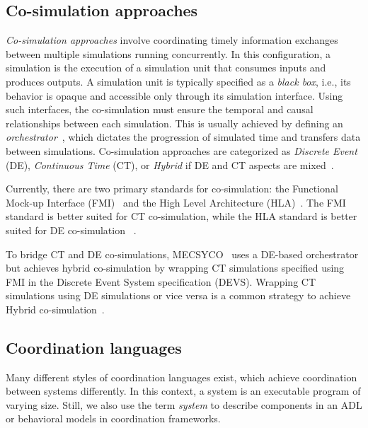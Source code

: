 \documentclass[runningheads]{llncs}
\begin{document}
\subsection{Co-simulation approaches} \label{subsec: cosim}

\textit{Co-simulation approaches} involve coordinating timely information exchanges between multiple simulations running concurrently.
In this configuration, a simulation is the execution of a simulation unit that consumes inputs and produces outputs.
A simulation unit is typically specified as a \textit{black box}, i.e., its behavior is opaque and accessible only through its simulation interface.
Using such interfaces, the co-simulation must ensure the temporal and causal relationships between each simulation. This is usually achieved by defining an \textit{orchestrator}~\cite{gomesCoSimulationSurvey2019}, which dictates the progression of simulated time and transfers data between simulations.
Co-simulation approaches are categorized as \textit{Discrete Event} (DE), \textit{Continuous Time} (CT), or \textit{Hybrid} if DE and CT aspects are mixed~\cite{gomesCoSimulationSurvey2019}.

Currently, there are two primary standards for co-simulation: the Functional Mock-up Interface (FMI)~\cite{modelisarFunctionalMockupInterface2023} and the High Level Architecture (HLA)~\cite{dahmannHighLevelArchitecture1997}.
The FMI standard is better suited for CT co-simulation, while the HLA standard is better suited for DE co-simulation ~\cite{gomesCoSimulationSurvey2019,liboniComplexSystemsCosimulation2021}.

To bridge CT and DE co-simulations, MECSYCO~\cite{camusHybridCosimulationFMUs2016,camusCosimulationCyberphysicalSystems2018} uses a DE-based orchestrator but achieves hybrid co-simulation by wrapping CT simulations specified using FMI in the Discrete Event System specification (DEVS).
Wrapping CT simulations using DE simulations or vice versa is a common strategy to achieve Hybrid co-simulation~\cite{gomesCoSimulationSurvey2019}.

\subsection{Coordination languages} \label{subsec: coordlang}
Many different styles of coordination languages exist, which achieve coordination between systems differently.
In this context, a system is an executable program of varying size.
Still, we also use the term \textit{system} to describe components in an ADL or behavioral models in coordination frameworks.
\end{document}
